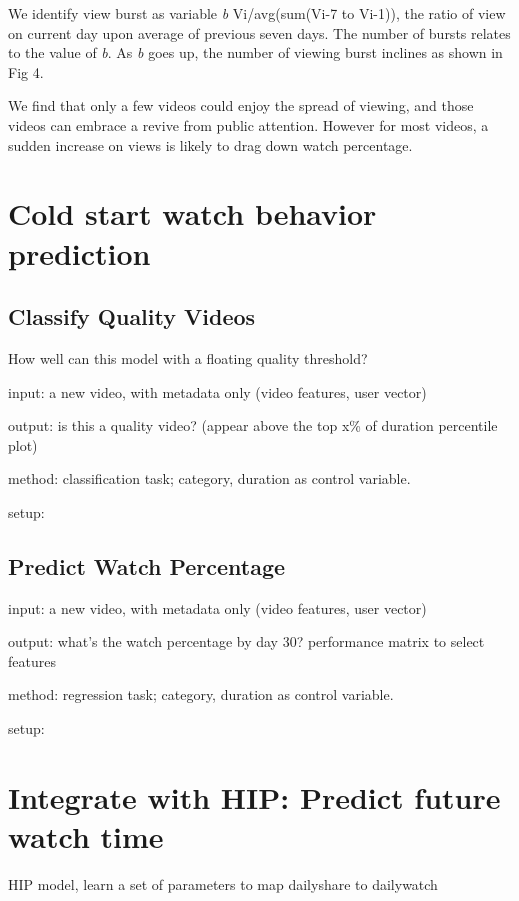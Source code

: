 We identify view burst as variable \textit{b} Vi/avg(sum(Vi-7 to Vi-1)), the ratio of view on current day upon average of previous seven days. The number of bursts relates to the value of \textit{b}. As \textit{b} goes up, the number of viewing burst inclines as shown in Fig 4.

We find that only a few videos could enjoy the spread of viewing, and those videos can embrace a revive from public attention. However for most videos, a sudden increase on views is likely to drag down watch percentage.


\section{Cold start watch behavior prediction}

\subsection{Classify Quality Videos}
How well can this model with a floating quality threshold?

input: a new video, with metadata only (video features, user vector)

output: is this a quality video? (appear above the top x\% of duration percentile plot)

method: classification task; category, duration as control variable.

setup: 

\subsection{Predict Watch Percentage}
input: a new video, with metadata only (video features, user vector)

output: what's the watch percentage by day 30? performance matrix to select features

method: regression task; category, duration as control variable.

setup: 


\section{Integrate with HIP: Predict future watch time}
HIP model, learn a set of parameters to map dailyshare to dailywatch

